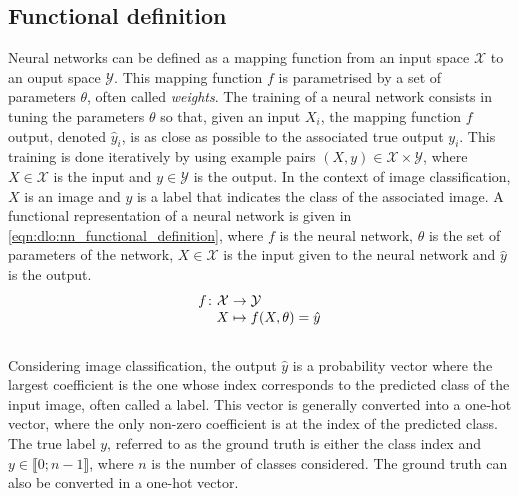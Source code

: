 \subsection{Functional definition}

Neural networks can be defined as a mapping function from an input space
$\mathcal{X}$ to an ouput space $\mathcal{Y}$. This mapping function $f$ is
parametrised by a set of parameters $\theta$, often called \emph{weights}. The
training of a neural network consists in tuning the parameters $\theta$ so that,
given an input $X_i$, the mapping function $f$ output, denoted $\hat{y}_i$, is
as close as possible to the associated true output $y_i$. This training is done
iteratively by using example pairs $(X, y) \in \mathcal{X} \times \mathcal{Y}$,
where $X\in\mathcal{X}$ is the input and $y\in\mathcal{Y}$ is the output. In the
context of image classification, $X$ is an image and $y$ is a label that
indicates the class of the associated image. A functional representation of a
neural network is given in \cref{eqn:dlo:nn_functional_definition}, where $f$ is
the neural network, $\theta$ is the set of parameters of the network,
$X\in\mathcal{X}$ is the input given to the neural network and $\hat{y}$ is the
output.\\

\begin{equation}
  \label{eqn:dlo:nn_functional_definition}
  \begingroup
  \setlength\arraycolsep{0pt}
  f \colon\begin{array}[t]{c >{{}}c<{{}} l}
    \mathcal{X} & \to     & \mathcal{Y} \\
    X                     & \mapsto & f(X, \theta) = \hat{y}
  \end{array}
  \endgroup
\end{equation}\\


Considering image classification,  the output $\hat{y}$ is a probability vector
where the largest coefficient is the one whose index corresponds to the
predicted class of the input image, often called a label. This vector is
generally converted into a one-hot vector, where the only non-zero coefficient is
at the index of the predicted class. The true label $y$, referred to as the
ground truth is either the class index and $y\in\llbracket0;n-1\rrbracket$,
where $n$ is the number of classes considered. The ground truth can also be
converted in a one-hot vector.\\


